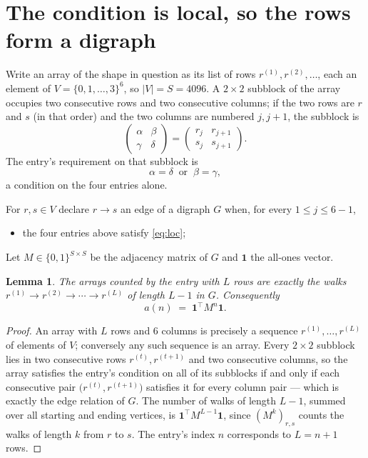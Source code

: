 \documentclass[11pt,a4paper]{article}
\theoremstyle{plain}
\newtheorem{lemma}[theorem]{Lemma}
\theoremstyle{definition}
\begin{document}
\section{The condition is local, so the rows form a digraph}

Write an array of the shape in question as its list of rows
$r^{(1)},r^{(2)},\dots$, each an element of
$V=\{0,1,\dots,3\}^{6}$, so $|V|=S=4096$. A $2\times2$ subblock of the array
occupies two consecutive rows and two consecutive columns; if the two rows are $r$
and $s$ (in that order) and the two columns are numbered $j,j+1$,
the subblock is
\[
\begin{pmatrix}\alpha&\beta\\\gamma&\delta\end{pmatrix}=\begin{pmatrix}r_j&r_{j+1}\\s_j&s_{j+1}\end{pmatrix}.
\]
The entry's requirement on that subblock is
\begin{equation}\label{eq:loc}
\alpha=\delta\ \text{ or }\ \beta=\gamma,
\end{equation}
a condition on the four entries alone.

For $r,s\in V$ declare $r\to s$ an edge of a digraph $G$ when, for every
$1\le j\le 6-1$,
\begin{itemize}
\item the four entries above satisfy \eqref{eq:loc};

\end{itemize}
Let $M\in\{0,1\}^{S\times S}$ be the adjacency matrix of $G$ and $\mathbf{1}$ the
all-ones vector.

\begin{lemma}\label{lem:walk}
The arrays counted by the entry with $L$ rows are exactly the walks
$r^{(1)}\to r^{(2)}\to\cdots\to r^{(L)}$ of length $L-1$ in $G$. Consequently
\[
a(n)\;=\;\mathbf{1}^{\!\top}M^{n}\mathbf{1} .
\]
\end{lemma}

\begin{proof}
An array with $L$ rows and $6$ columns is precisely a sequence
$r^{(1)},\dots,r^{(L)}$ of elements of $V$; conversely any such sequence is an array.
Every $2\times2$ subblock lies in two consecutive rows $r^{(t)},r^{(t+1)}$ and two
consecutive columns, so the array satisfies the entry's condition on all of its subblocks
if and only if each consecutive pair $\bigl(r^{(t)},r^{(t+1)}\bigr)$ satisfies it for
every column pair --- which is exactly the edge relation of $G$. The number of walks of
length $L-1$, summed over all starting and ending vertices, is
$\mathbf{1}^{\!\top}M^{L-1}\mathbf{1}$, since $(M^{k})_{r,s}$ counts the walks of
length $k$ from $r$ to $s$. The entry's index $n$ corresponds to $L=n+1$ rows.
\end{proof}
\end{document}
